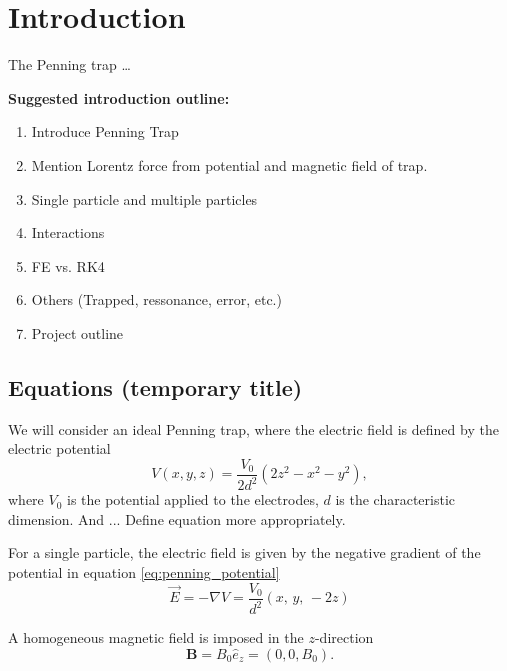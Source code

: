 \section{Introduction}\label{sec:introduction}


The Penning trap \dots %

\textbf{Suggested introduction outline:}
\begin{enumerate}
    \item Introduce Penning Trap 
    \item Mention Lorentz force from potential and magnetic field of trap. 
    \item Single particle and multiple particles 
    \item Interactions 
    \item FE vs. RK4 
    \item Others (Trapped, ressonance, error, etc.)
    \item Project outline 
\end{enumerate}

\subsection*{Equations (temporary title)}
We will consider an ideal Penning trap, where the electric field is defined by the electric potential 
\begin{equation}
    V(x,y,z) = \frac{V_0}{2d^2}(2z^2 - x^2 - y^2), \label{eq:penning_potential}
\end{equation}
where $V_0$ is the potential applied to the electrodes, $d$ is the characteristic dimension. And ... Define equation more appropriately. 

For a single particle, the electric field is given by the negative gradient of the potential in equation \eqref{eq:penning_potential}
\begin{equation}
    \vec{E} = -\nabla V = \frac{V_0}{d^2} (x,\,y,\,-2z) \label{eq:p1_E_field_pot_gradient}
\end{equation}

A homogeneous magnetic field is imposed in the $z$-direction 
\begin{equation}
    \mathbf{B}= B_0 \hat{e}_z = (0,0,B_0). \label{eq:homogeneous_B_field}
\end{equation}

